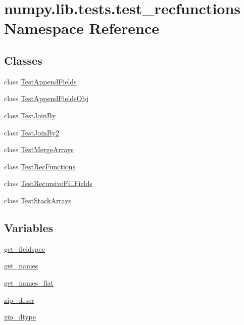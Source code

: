 \hypertarget{namespacenumpy_1_1lib_1_1tests_1_1test__recfunctions}{}\section{numpy.\+lib.\+tests.\+test\+\_\+recfunctions Namespace Reference}
\label{namespacenumpy_1_1lib_1_1tests_1_1test__recfunctions}
\subsection*{Classes}
\begin{DoxyCompactItemize}
\item 
class \hyperlink{classnumpy_1_1lib_1_1tests_1_1test__recfunctions_1_1TestAppendFields}{Test\+Append\+Fields}
\item 
class \hyperlink{classnumpy_1_1lib_1_1tests_1_1test__recfunctions_1_1TestAppendFieldsObj}{Test\+Append\+Fields\+Obj}
\item 
class \hyperlink{classnumpy_1_1lib_1_1tests_1_1test__recfunctions_1_1TestJoinBy}{Test\+Join\+By}
\item 
class \hyperlink{classnumpy_1_1lib_1_1tests_1_1test__recfunctions_1_1TestJoinBy2}{Test\+Join\+By2}
\item 
class \hyperlink{classnumpy_1_1lib_1_1tests_1_1test__recfunctions_1_1TestMergeArrays}{Test\+Merge\+Arrays}
\item 
class \hyperlink{classnumpy_1_1lib_1_1tests_1_1test__recfunctions_1_1TestRecFunctions}{Test\+Rec\+Functions}
\item 
class \hyperlink{classnumpy_1_1lib_1_1tests_1_1test__recfunctions_1_1TestRecursiveFillFields}{Test\+Recursive\+Fill\+Fields}
\item 
class \hyperlink{classnumpy_1_1lib_1_1tests_1_1test__recfunctions_1_1TestStackArrays}{Test\+Stack\+Arrays}
\end{DoxyCompactItemize}
\subsection*{Variables}
\begin{DoxyCompactItemize}
\item 
\hyperlink{namespacenumpy_1_1lib_1_1tests_1_1test__recfunctions_a1b8aa518a5e1d107251f36d0e8206bfb}{get\+\_\+fieldspec}
\item 
\hyperlink{namespacenumpy_1_1lib_1_1tests_1_1test__recfunctions_ab5945c008367e82cfb1b8862ed057657}{get\+\_\+names}
\item 
\hyperlink{namespacenumpy_1_1lib_1_1tests_1_1test__recfunctions_ab8d4dd713dad3c368604022b3decef45}{get\+\_\+names\+\_\+flat}
\item 
\hyperlink{namespacenumpy_1_1lib_1_1tests_1_1test__recfunctions_a8bf3dc5fbb178b40e10cf10222e3773d}{zip\+\_\+descr}
\item 
\hyperlink{namespacenumpy_1_1lib_1_1tests_1_1test__recfunctions_a13f3d5356e582246dc693e61f532200f}{zip\+\_\+dtype}
\end{DoxyCompactItemize}


